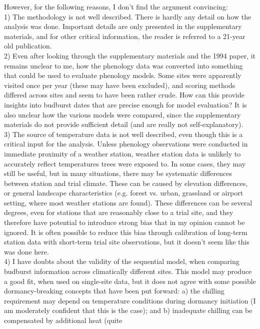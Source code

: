 \documentclass[11pt]{article}
\begin{document}
However, for the following reasons, I don’t find the
argument convincing:\\
1)      The methodology is not well described. There is hardly any detail on how the
analysis was done. Important details are only presented in the supplementary materials,
and for other critical information, the reader is referred to a 21-year old publication.\\
2)      Even after looking through the supplementary materials and the 1994 paper, it
remains unclear to me, how the phenology data was converted into something that could be
used to evaluate phenology models. Some sites were apparently visited once per year
(these may have been excluded), and scoring methods differed across sites and seem to
have been rather crude. How can this provide insights into budburst dates that are
precise enough for model evaluation? It is also unclear how the various models were
compared, since the supplementary materials do not provide sufficient detail (and are
 really not self-explanatory).\\
3)      The source of temperature data is not well described, even though this is a
critical input for the analysis. Unless phenology observations were conducted in
immediate proximity of a weather station, weather station data is unlikely to accurately
reflect temperatures trees were exposed to. In some cases, they may still be useful, but
in many situations, there may be systematic differences between station and trial
climate. These can be caused by elevation differences, or general landscape
characteristics (e.g. forest vs. urban, grassland or airport setting, where most weather
stations are found). These differences can be several degrees, even for stations that are
reasonably close to a trial site, and they therefore have potential to introduce strong
bias that in my opinion cannot be ignored. It is often possible to reduce this bias
through calibration of long-term station data with short-term trial site observations,
but it doesn’t seem like this was done here.\\
4)      I have doubts about the validity of the sequential model, when comparing budburst
information across climatically different sites. This model may produce a good fit, when
used on single-site data, but it does not agree with some possible dormancy-breaking
concepts that have been put forward: a) the chilling requirement may depend on
temperature conditions during dormancy initiation (I am moderately confident that this is
the case); and b) inadequate chilling can be compensated by additional heat (quite
\end{document}

